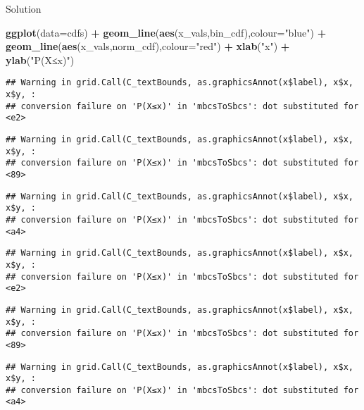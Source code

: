 \documentclass[
]{book}
\newenvironment{Shaded}{\begin{snugshade}}{\end{snugshade}}
\newcommand{\AttributeTok}[1]{\textcolor[rgb]{0.13,0.29,0.53}{#1}}
\newcommand{\FunctionTok}[1]{\textcolor[rgb]{0.13,0.29,0.53}{\textbf{#1}}}
\newcommand{\NormalTok}[1]{#1}
\newcommand{\SpecialCharTok}[1]{\textcolor[rgb]{0.81,0.36,0.00}{\textbf{#1}}}
\newcommand{\StringTok}[1]{\textcolor[rgb]{0.31,0.60,0.02}{#1}}
\begin{document}
Solution

\begin{Shaded}
\begin{Highlighting}[]
\FunctionTok{ggplot}\NormalTok{(}\AttributeTok{data=}\NormalTok{cdfs) }\SpecialCharTok{+} \FunctionTok{geom\_line}\NormalTok{(}\FunctionTok{aes}\NormalTok{(x\_vals,bin\_cdf),}\AttributeTok{colour=}\StringTok{"blue"}\NormalTok{) }\SpecialCharTok{+} \FunctionTok{geom\_line}\NormalTok{(}\FunctionTok{aes}\NormalTok{(x\_vals,norm\_cdf),}\AttributeTok{colour=}\StringTok{"red"}\NormalTok{) }\SpecialCharTok{+} \FunctionTok{xlab}\NormalTok{(}\StringTok{"x"}\NormalTok{) }\SpecialCharTok{+} \FunctionTok{ylab}\NormalTok{(}\StringTok{"P(X≤x)"}\NormalTok{) }
\end{Highlighting}
\end{Shaded}

\begin{verbatim}
## Warning in grid.Call(C_textBounds, as.graphicsAnnot(x$label), x$x, x$y, :
## conversion failure on 'P(X≤x)' in 'mbcsToSbcs': dot substituted for <e2>
\end{verbatim}

\begin{verbatim}
## Warning in grid.Call(C_textBounds, as.graphicsAnnot(x$label), x$x, x$y, :
## conversion failure on 'P(X≤x)' in 'mbcsToSbcs': dot substituted for <89>
\end{verbatim}

\begin{verbatim}
## Warning in grid.Call(C_textBounds, as.graphicsAnnot(x$label), x$x, x$y, :
## conversion failure on 'P(X≤x)' in 'mbcsToSbcs': dot substituted for <a4>
\end{verbatim}

\begin{verbatim}
## Warning in grid.Call(C_textBounds, as.graphicsAnnot(x$label), x$x, x$y, :
## conversion failure on 'P(X≤x)' in 'mbcsToSbcs': dot substituted for <e2>
\end{verbatim}

\begin{verbatim}
## Warning in grid.Call(C_textBounds, as.graphicsAnnot(x$label), x$x, x$y, :
## conversion failure on 'P(X≤x)' in 'mbcsToSbcs': dot substituted for <89>
\end{verbatim}

\begin{verbatim}
## Warning in grid.Call(C_textBounds, as.graphicsAnnot(x$label), x$x, x$y, :
## conversion failure on 'P(X≤x)' in 'mbcsToSbcs': dot substituted for <a4>
\end{verbatim}
\end{document}
